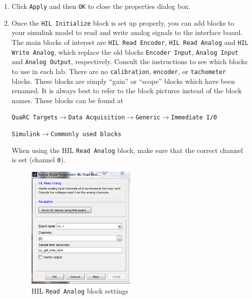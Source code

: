 \begin{enumerate}
    \item Click \verb|Apply| and then \verb|OK| to close the properties dialog box.

    \item Once the \verb|HIL Initialize| block is set up properly, you can add
          blocks to your simulink model to read and write analog signals to the
          interface board.  The main blocks of interest are \verb|HIL Read Encoder|,
          \verb|HIL Read Analog| and \verb|HIL Write Analog|, which replace the old
          blocks \verb|Encoder Input|, \verb|Analog Input| and \verb|Analog Output|,
          respectively.  Consult the instructions to see which blocks to use in each
          lab. There are no \verb|calibration|, \verb|encoder|, or \verb|tachometer|
          blocks.  These blocks are simply ``gain'' or ``scope'' blocks which have been
          renamed.  It is always best to refer to the block pictures instead of the
          block names.  These blocks can be found at
          \begin{center}
              \verb|QuaRC Targets|\(\to \)\verb|Data Acquisition|\(\to \)\verb|Generic|\(\to \)\verb|Immediate I/0|
          \end{center}
          \begin{center}
              \verb|Simulink|\(\to \)\verb|Commonly used blocks|
          \end{center}
          When using the HIL \verb|Read Analog| block, make sure that the correct
          channel is set (channel \verb|0|).
          \begin{figure}[htbp]
              \centering
              \includegraphics[width=0.5\textwidth]{pix/hil-read-analog-block.PNG}
              \caption{HIL \texttt{Read Analog} block settings}\label{fig:hilrab}
          \end{figure}

\end{enumerate}

